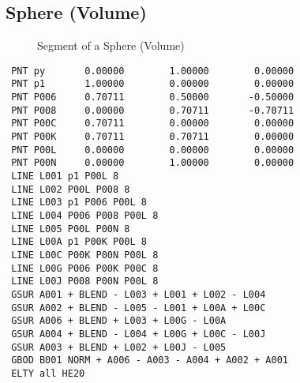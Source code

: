 \documentclass{article}
\begin{document}
\begin{appendix}
\subsection{\label{Sphere (Volume)}Sphere (Volume)}
\begin{figure}[h]
\caption{\label{Segment of a SphereV}Segment of a Sphere (Volume)}
\end{figure}
\begin{verbatim}
 PNT py       0.00000        1.00000        0.00000 
 PNT p1       1.00000        0.00000        0.00000 
 PNT P006     0.70711        0.50000       -0.50000 
 PNT P008     0.00000        0.70711       -0.70711 
 PNT P00C     0.70711        0.00000        0.00000 
 PNT P00K     0.70711        0.70711        0.00000 
 PNT P00L     0.00000        0.00000        0.00000 
 PNT P00N     0.00000        1.00000        0.00000 
 LINE L001 p1 P00L 8              
 LINE L002 P00L P008 8              
 LINE L003 p1 P006 P00L 8              
 LINE L004 P006 P008 P00L 8              
 LINE L005 P00L P00N 8              
 LINE L00A p1 P00K P00L 8              
 LINE L00C P00K P00N P00L 8              
 LINE L00G P006 P00K P00C 8              
 LINE L00J P008 P00N P00L 8              
 GSUR A001 + BLEND - L003 + L001 + L002 - L004 
 GSUR A002 + BLEND - L005 - L001 + L00A + L00C 
 GSUR A006 + BLEND + L003 + L00G - L00A 
 GSUR A004 + BLEND - L004 + L00G + L00C - L00J 
 GSUR A003 + BLEND + L002 + L00J - L005 
 GBOD B001 NORM + A006 - A003 - A004 + A002 + A001 
 ELTY all HE20 
\end{verbatim}



\end{appendix}
\end{document}
